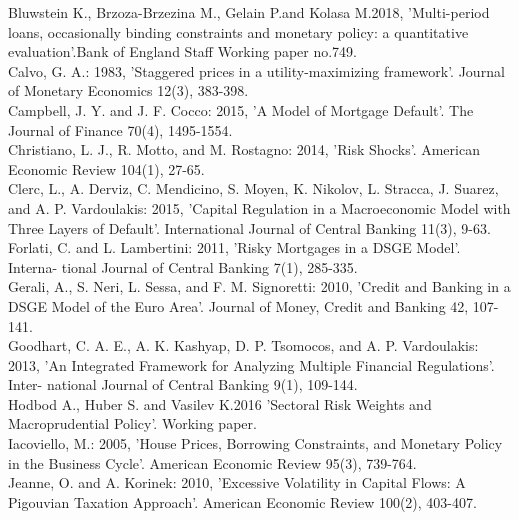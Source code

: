 \documentclass[12pt]{article}
\numberwithin{equation}{section}
\begin{document}
Bluwstein K., Brzoza-Brzezina M., Gelain P.and Kolasa M.2018, 'Multi-period loans, occasionally binding constraints and monetary policy:
a quantitative evaluation'.Bank of England Staff Working paper no.749.\\

Calvo, G. A.: 1983, 'Staggered prices in a utility-maximizing framework'. Journal of Monetary Economics 12(3), 383-398.\\

Campbell, J. Y. and J. F. Cocco: 2015, 'A Model of Mortgage Default'. The Journal of Finance 70(4), 1495-1554.\\

Christiano, L. J., R. Motto, and M. Rostagno: 2014, 'Risk Shocks'. American
Economic Review 104(1), 27-65.\\

Clerc, L., A. Derviz, C. Mendicino, S. Moyen, K. Nikolov, L. Stracca, J. Suarez,
and A. P. Vardoulakis: 2015, 'Capital Regulation in a Macroeconomic Model with
Three Layers of Default'. International Journal of Central Banking 11(3), 9-63.\\

Forlati, C. and L. Lambertini: 2011, 'Risky Mortgages in a DSGE Model'. Interna-
tional Journal of Central Banking 7(1), 285-335.\\

Gerali, A., S. Neri, L. Sessa, and F. M. Signoretti: 2010, 'Credit and Banking in
a DSGE Model of the Euro Area'. Journal of Money, Credit and Banking 42,
107-141.\\

Goodhart, C. A. E., A. K. Kashyap, D. P. Tsomocos, and A. P. Vardoulakis: 2013,
'An Integrated Framework for Analyzing Multiple Financial Regulations'. Inter-
national Journal of Central Banking 9(1), 109-144.\\

 Hodbod A.,  Huber S. and Vasilev K.2016 'Sectoral Risk Weights and Macroprudential Policy'. Working paper.\\
 
Iacoviello, M.: 2005, 'House Prices, Borrowing Constraints, and Monetary Policy in
the Business Cycle'. American Economic Review 95(3), 739-764.\\

Jeanne, O. and A. Korinek: 2010, 'Excessive Volatility in Capital Flows: A Pigouvian
Taxation Approach'. American Economic Review 100(2), 403-407.\\
\end{document}
